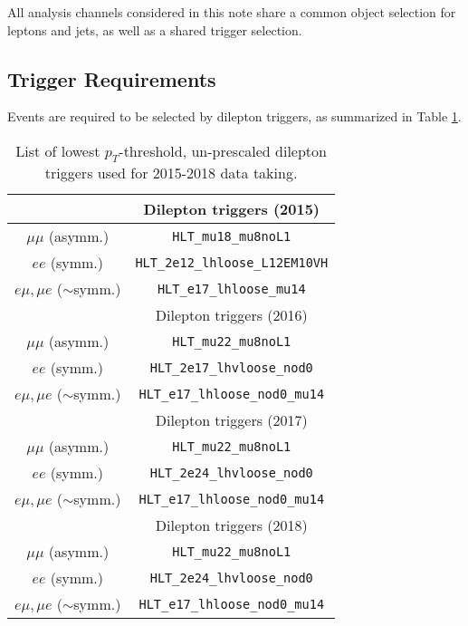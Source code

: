 
All analysis channels considered in this note share a common object selection for leptons and jets, as well as a shared trigger selection. 

\subsection{Trigger Requirements}

Events are required to be selected by dilepton triggers, as summarized in Table \ref{tbl:trigger}.

\begin{table}[H]
 \begin{center}
   \begin{tabular}{cc}
     \toprule
                  & Dilepton triggers (2015) \\
     \midrule
      $\mu\mu$ (asymm.)          & \verb!HLT_mu18_mu8noL1! \\
      $ee$ (symm.)               & \verb!HLT_2e12_lhloose_L12EM10VH! \\
      $e\mu,\mu e$ ($\sim$symm.) & \verb!HLT_e17_lhloose_mu14! \\
     \bottomrule
                       & Dilepton triggers (2016) \\
     \midrule
      $\mu\mu$ (asymm.)                   & \verb!HLT_mu22_mu8noL1! \\
      $ee$ (symm.)                        & \verb!HLT_2e17_lhvloose_nod0! \\
      $e\mu,\mu e$ ($\sim$symm.)          & \verb!HLT_e17_lhloose_nod0_mu14! \\
     \bottomrule

                  & Dilepton triggers (2017) \\
     \midrule
      $\mu\mu$ (asymm.)                   & \verb!HLT_mu22_mu8noL1! \\
      $ee$ (symm.)                        & \verb!HLT_2e24_lhvloose_nod0! \\
      $e\mu,\mu e$ ($\sim$symm.)          & \verb!HLT_e17_lhloose_nod0_mu14! \\
     \bottomrule
                  & Dilepton triggers (2018) \\
     \midrule
      $\mu\mu$ (asymm.)                   & \verb!HLT_mu22_mu8noL1! \\
      $ee$ (symm.)                        & \verb!HLT_2e24_lhvloose_nod0! \\
      $e\mu,\mu e$ ($\sim$symm.)          & \verb!HLT_e17_lhloose_nod0_mu14! \\
      \bottomrule
   \end{tabular}
   \caption{\label{tbl:trigger} List of lowest $p_{T}$-threshold, un-prescaled dilepton triggers used for 2015-2018 data taking.}
 \end{center}
\end{table}


